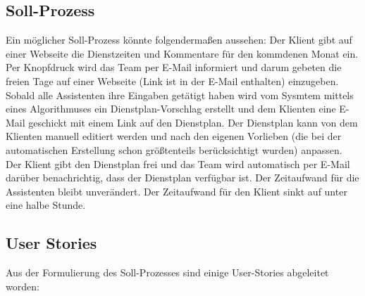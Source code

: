 \documentclass[12pt,a4paper,titlepage]{article} %
\begin{document}
\subsection{Soll-Prozess}
Ein möglicher Soll-Prozess könnte folgendermaßen aussehen: %
Der Klient gibt auf einer Webseite die Dienstzeiten und Kommentare für den kommdenen Monat ein. Per Knopfdruck wird das Team per E-Mail informiert und darum gebeten die freien Tage auf einer Webseite (Link ist in der E-Mail enthalten) einzugeben. Sobald alle Assistenten ihre Eingaben getätigt haben wird vom Sysmtem mittels eines Algorithmuses
 ein Dienstplan-Vorschlag erstellt und dem Klienten eine E-Mail geschickt mit einem Link auf den Dienstplan. Der Dienstplan kann von dem Klienten manuell editiert werden und nach den eigenen Vorlieben (die bei der automatischen Erstellung schon größtenteils berücksichtigt wurden) anpassen. Der Klient gibt den Dienstplan frei und das Team wird automatisch per E-Mail darüber benachrichtig, dass der Dienstplan verfügbar ist.
Der Zeitaufwand für die Assistenten bleibt unverändert. Der Zeitaufwand für den Klient sinkt auf unter eine halbe Stunde.

\subsection{User Stories}
Aus der Formulierung des Soll-Prozesses sind einige User-Stories abgeleitet worden:
\end{document}
